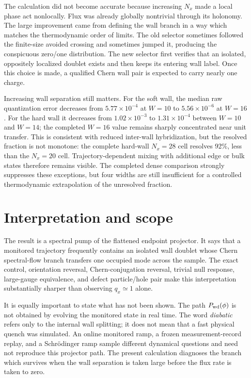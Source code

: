 \documentclass[aps,prb,twocolumn,floatfix,nofootinbib,superscriptaddress]{revtex4-2}
\begin{document}
The calculation did not become accurate because increasing $N_x$ made a
local phase act nonlocally.  Flux was already globally nontrivial through its
holonomy.  The large improvement came from defining the wall branch in a way
which matches the thermodynamic order of limits.  The old selector sometimes
followed the finite-size avoided crossing and sometimes jumped it, producing
the conspicuous zero/one distribution.  The new selector first verifies that
an isolated, oppositely localized doublet exists and then keeps its entering
wall label.  Once this choice is made, a qualified Chern wall pair is expected
to carry nearly one charge.

Increasing wall separation still matters.  For the soft wall, the median raw
quantization error decreases from $5.77\times10^{-4}$ at $W=10$ to
$5.56\times10^{-6}$ at $W=16$.  For the hard wall it decreases from
$1.02\times10^{-3}$ to $1.31\times10^{-4}$ between $W=10$ and $W=14$; the
completed $W=16$ value remains sharply concentrated near unit transfer.  This
is consistent with reduced inter-wall hybridization, but the resolved
fraction is not monotone: the complete hard-wall $N_x=28$ cell resolves 92\%,
less than the $N_x=20$ cell.  Trajectory-dependent mixing with additional
edge or bulk states therefore remains visible.  The completed dense
comparison strongly suppresses these exceptions, but four widths are still
insufficient for a controlled thermodynamic extrapolation of the unresolved
fraction.

\section{Interpretation and scope}

The result is a spectral pump of the flattened endpoint projector.  It says
that a monitored trajectory frequently contains an isolated wall doublet
whose Chern spectral-flow branch transfers one occupied mode across the
sample.  The exact control, orientation reversal, Chern-conjugation reversal,
trivial null response, large-gauge equivalence, and defect particle/hole pair
make this interpretation substantially sharper than observing $q_x\simeq1$
alone.

It is equally important to state what has not been shown.  The path
$P_{\rm wd}(\phi)$ is not obtained by evolving the monitored state in real
time.  The word \emph{diabatic} refers only to the internal wall splitting;
it does not mean that a fast physical quench was simulated.  An online
monitored ramp, a frozen measurement-record replay, and a Schr\"odinger ramp
sample different dynamical questions and need not reproduce this projector
path.  The present calculation diagnoses the branch which survives when the
wall separation is taken large before the flux rate is taken to zero.
\end{document}
